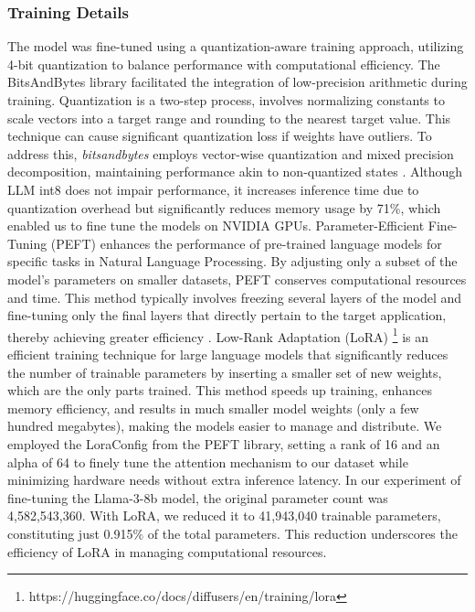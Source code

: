 \documentclass[logo,msc]{infthesis}           %
\begin{document}
\subsubsection*{Training Details}
\label{sec4.3.1}
The model was fine-tuned using a quantization-aware training approach, utilizing 4-bit quantization to balance performance with computational efficiency. The BitsAndBytes library facilitated the integration of low-precision arithmetic during training. Quantization is a two-step process, involves normalizing constants to scale vectors into a target range and rounding to the nearest target value. This technique can cause significant quantization loss if weights have outliers. To address this, \textit{bitsandbytes} employs vector-wise quantization and mixed precision decomposition, maintaining performance akin to non-quantized states \cite{j2024finetuningllmenterprise}. Although LLM int8 does not impair performance, it increases inference time due to quantization overhead but significantly reduces memory usage by 71\%, which enabled us to fine tune the models on NVIDIA GPUs.
Parameter-Efficient Fine-Tuning (PEFT) enhances the performance of pre-trained language models for specific tasks in Natural Language Processing. By adjusting only a subset of the model’s parameters on smaller datasets, PEFT conserves computational resources and time. This method typically involves freezing several layers of the model and fine-tuning only the final layers that directly pertain to the target application, thereby achieving greater efficiency \cite{j2024finetuningllmenterprise}. Low-Rank Adaptation (LoRA) \footnote{https://huggingface.co/docs/diffusers/en/training/lora} is an efficient training technique for large language models that significantly reduces the number of trainable parameters by inserting a smaller set of new weights, which are the only parts trained. This method speeds up training, enhances memory efficiency, and results in much smaller model weights (only a few hundred megabytes), making the models easier to manage and distribute. We employed the LoraConfig from the PEFT library, setting a rank of 16 and an alpha of 64 to finely tune the attention mechanism to our dataset while minimizing hardware needs without extra inference latency. In our experiment of fine-tuning the Llama-3-8b model, the original parameter count was 4,582,543,360. With LoRA, we reduced it to 41,943,040 trainable parameters, constituting just 0.915\% of the total parameters. This reduction underscores the efficiency of LoRA in managing computational resources.
\end{document}
